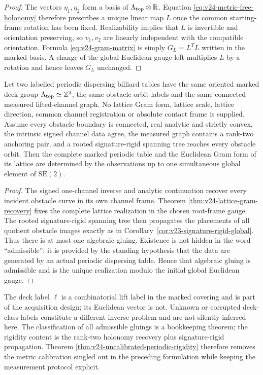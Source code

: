\begin{proof}
The vectors \(\eta_1,\eta_2\) form a basis of
\(\Lambda_{\rm top}\otimes\mathbb R\).  Equation
\eqref{eq:v24-metric-free-holonomy} therefore prescribes a unique linear map
\(L\) once the common starting-frame rotation has been fixed.  Realizability
implies that \(L\) is invertible and orientation preserving, so
\(v_1,v_2\) are linearly independent with the compatible orientation.
Formula \eqref{eq:v24-gram-matrix} is simply
\(G_L=L^TL\) written in the marked basis.  A change of the global Euclidean
gauge left-multiplies \(L\) by a rotation and hence leaves \(G_L\) unchanged.
\end{proof}

\begin{theorem}
\label{thm:v24-uncalibrated-periodic-rigidity}
Let two labelled periodic dispersing billiard tables have the same oriented
marked deck group \(\Lambda_{\rm top}\simeq\mathbb Z^2\), the same
obstacle-orbit labels and the same connected measured lifted-channel graph.
No lattice Gram form, lattice scale, lattice direction, common channel
registration or absolute contact frame is supplied.  Assume every obstacle
boundary is connected, real analytic and strictly convex, the intrinsic signed
channel data agree, the measured graph contains a rank-two anchoring pair, and
a rooted signature-rigid spanning tree reaches every obstacle orbit.
Then the complete marked periodic table and the Euclidean Gram form of its
lattice are determined by the observations up to one simultaneous global
element of \(\mathrm{SE}(2)\).
\end{theorem}

\begin{proof}
The signed one-channel inverse and analytic continuation recover every
incident obstacle curve in its own channel frame.  Theorem
\ref{thm:v24-lattice-gram-recovery} fixes the complete lattice realization in
the chosen root-frame gauge.  The rooted signature-rigid spanning tree then
propagates the placements of all quotient obstacle images exactly as in
Corollary~\ref{cor:v23-signature-rigid-global}.  Thus there is at most one
algebraic gluing.  Existence is not hidden in the word ``admissible'': it is
provided by the standing hypothesis that the data are generated by an actual
periodic dispersing table.  Hence that algebraic gluing is admissible and is
the unique realization modulo the initial global Euclidean gauge.
\end{proof}

\begin{remark}
\label{rem:v24-deck-operational}
The deck label \(\ell\) is a combinatorial lift label in the marked covering
and is part of the acquisition design; its Euclidean vector is not.  Unknown
or corrupted deck-class labels constitute a different inverse problem and are
not silently inferred here.  The classification of all admissible gluings is
a bookkeeping theorem; the rigidity content is the rank-two holonomy recovery
plus signature-rigid propagation.  Theorem
\ref{thm:v24-uncalibrated-periodic-rigidity} therefore removes the metric
calibration singled out in the preceding formulation while keeping the
measurement protocol explicit.
\end{remark}
